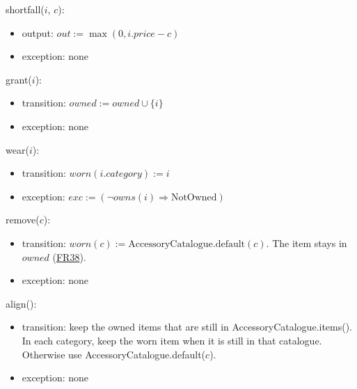 \documentclass[10pt, titlepage]{article}
\newcommand{\srsurl}{https://team-hindsight.github.io/ophthamology-game/SRS/SRS.pdf}
\newcommand{\srsitemref}[2]{\href{\srsurl\#nameddest=#1}{#2}}
\newcommand{\T}[1]{\mathit{#1}}          %
\newcommand{\out}{\mathit{out}}
\newcommand{\exc}{\mathit{exc}}
\begin{document}
\begin{samepage}
\noindent shortfall($i$, $c$):
\begin{itemize}
\item output: $\out := \max(0, i.\T{price} - c)$
\item exception: none
\end{itemize}
\end{samepage}
\par\pagebreak[0]

\begin{samepage}
\noindent grant($i$):
\begin{itemize}
\item transition: $\T{owned} := \T{owned} \cup \{i\}$
\item exception: none
\end{itemize}
\end{samepage}
\par\pagebreak[0]

\begin{samepage}
\noindent wear($i$):
\begin{itemize}
\item transition: $\T{worn}(i.\T{category}) := i$
\item exception: $\exc := (\neg\T{owns}(i) \Rightarrow \text{NotOwned})$
\end{itemize}
\end{samepage}
\par\pagebreak[0]

\begin{samepage}
\noindent remove($c$):
\begin{itemize}
\item transition: $\T{worn}(c) := \text{AccessoryCatalogue.default}(c)$. The
  item stays in $\T{owned}$ (\srsitemref{FR_Equip}{FR38}).
\item exception: none
\end{itemize}
\end{samepage}
\par\pagebreak[0]

\begin{samepage}
\noindent align():
\begin{itemize}
\item transition: keep the owned items that are still in
  AccessoryCatalogue.items(). In each category, keep the worn item
  when it is still in that catalogue. Otherwise use
  AccessoryCatalogue.default($c$).
\item exception: none
\end{itemize}
\end{samepage}
\par\pagebreak[0]
\end{document}
